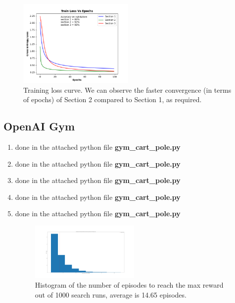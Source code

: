 \documentclass{assignmeownt}
\begin{document}
\begin{enumerate}
        \begin{figure}[H]
            \centering
            \includegraphics[width=0.5\textwidth]{train_loss_plots.png}
            \caption{Training loss curve. We can observe the faster convergence (in terms of epochs) of Section 2 compared to Section 1, as required.}
            \label{fig:figure_label}
        \end{figure}       
        
        
    \end{enumerate} %


\subsection{OpenAI Gym}
    \begin{enumerate} %
        \item done in the attached python file \textbf{gym\_cart\_pole.py}
        \item done in the attached python file \textbf{gym\_cart\_pole.py}
        \item done in the attached python file \textbf{gym\_cart\_pole.py}
        \item done in the attached python file \textbf{gym\_cart\_pole.py}
        \item done in the attached python file \textbf{gym\_cart\_pole.py}
        \begin{figure}[H]
            \centering
            \includegraphics[width=0.5\textwidth]{4_2_5_hist.png}
            \caption{Histogram of the number of episodes to reach the max reward out of 1000 search runs, average is 14.65 episodes.}
            \label{fig:figure_label}
        \end{figure}
    \end{enumerate} %
\end{document}
